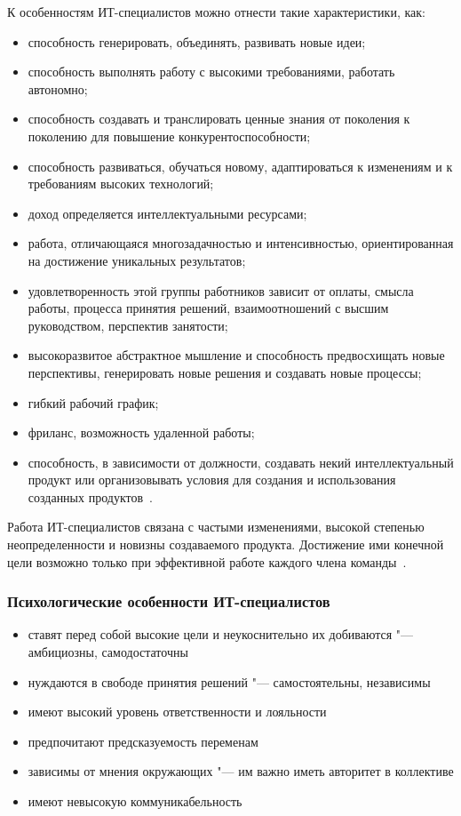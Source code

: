 \documentclass{../industrial-development}
\begin{document}
К особенностям ИТ-специалистов можно отнести такие характеристики, как:
 \begin{itemize}
	\item	способность генерировать, объединять, развивать новые идеи; 
	\item	способность выполнять работу с высокими требованиями, работать автономно;
	\item способность создавать и транслировать ценные знания от поколения к поколению для повышение конкурентоспособности;
	\item способность развиваться, обучаться новому, адаптироваться к изменениям и к требованиям высоких технологий; 
	\item доход определяется интеллектуальными ресурсами; 
	\item работа, отличающаяся многозадачностью и интенсивностью, ориентированная на достижение уникальных результатов;
	\item удовлетворенность этой группы работников зависит от оплаты, смысла работы, процесса принятия решений, взаимоотношений с высшим руководством, перспектив занятости;
	\item высокоразвитое абстрактное мышление и способность предвосхищать новые перспективы, генерировать новые решения и создавать новые процессы;
	\item гибкий рабочий график;
	\item фриланс, возможность удаленной работы;
	\item способность, в зависимости от должности, создавать некий интеллектуальный продукт или организовывать условия для создания и использования созданных продуктов~\cite[с.~2--3]{Zavyalova}.
 \end{itemize}
		
Работа ИТ-специалистов связана с частыми изменениями, высокой степенью неопределенности и новизны создаваемого продукта. Достижение ими конечной цели возможно только при эффективной работе каждого члена команды~\cite{MotivationIT}.

\begin{frame} \frametitle{Психологические особенности ИТ-специалистов}
  \begin{itemize}
	 \item ставят перед собой высокие цели и неукоснительно их добиваются "--- амбициозны, самодостаточны 
		\item нуждаются в свободе принятия решений "--- самостоятельны, независимы
		\item имеют высокий уровень ответственности и лояльности
		\item предпочитают предсказуемость переменам
	\item зависимы от мнения окружающих "--- им важно иметь авторитет в коллективе
	\item имеют невысокую коммуникабельность
    \end{itemize}

\end{frame}
\lecturenotes
\end{document}
